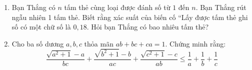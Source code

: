 \begin{ex} %
	\begin{enumerate}
		\item[a)] Bạn Thắng có $n$ tấm thẻ cùng loại được đánh số từ $1$ đến $n$. Bạn Thắng rút ngẫu nhiên 1 tấm thẻ. Biết rằng xác suất của biến cố “Lấy được tấm thẻ ghi số có một chữ số là $0,18$. Hỏi bạn Thắng có bao nhiêu tấm thẻ?
		\item[b)] Cho ba số dương $a, b, c$ thỏa mãn $ab + bc + ca = 1$. Chứng minh rằng:
		$$ \frac{\sqrt{a^2+1}-a}{bc} + \frac{\sqrt{b^2+1}-b}{ac} + \frac{\sqrt{c^2+1}-c}{ab} \le \frac{1}{a} + \frac{1}{b} + \frac{1}{c} $$
	\end{enumerate}
	
	
\end{ex}
	


